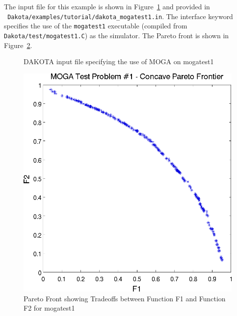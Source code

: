 The input file for this example is shown in
Figure~\ref{additional:moga1inp} and provided in \\ {\tt
Dakota/examples/tutorial/dakota\_mogatest1.in}.  The interface keyword
specifies the use of the \texttt{mogatest1} executable (compiled from
\texttt{Dakota/test/mogatest1.C}) as the simulator.  The Pareto front
is shown in Figure~\ref{additional:moga1front}.

\begin{figure}
  \centering
  \begin{small}
    \begin{bigbox}
    \end{bigbox}
  \end{small}
  \caption{DAKOTA input file specifying the use of MOGA on mogatest1}
  \label{additional:moga1inp}
\end{figure}

\begin{figure}
  \centering
  \includegraphics[scale=0.75]{images/dakota_mogatest1_pareto_front}
  \caption{Pareto Front showing Tradeoffs between Function F1 and
    Function F2 for mogatest1}
  \label{additional:moga1front}
\end{figure}


